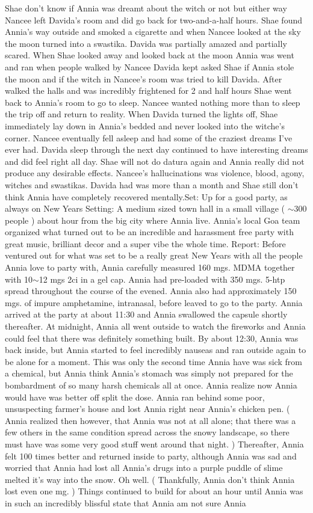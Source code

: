 \documentclass[12pt]{book}
\begin{document}
Shae don't know if Annia was dreamt about the witch or not but either way Nancee left Davida's room and did go back for two-and-a-half hours. Shae found Annia's way outside and smoked a cigarette and when Nancee looked at the sky the moon turned into a swastika. Davida was partially amazed and partially scared. When Shae looked away and looked back at the moon Annia was went and ran when people walked by Nancee Davida kept asked Shae if Annia stole the moon and if the witch in Nancee's room was tried to kill Davida. After walked the halls and was incredibly frightened for 2 and half hours Shae went back to Annia's room to go to sleep. Nancee wanted nothing more than to sleep the trip off and return to reality. When Davida turned the lights off, Shae immediately lay down in Annia's bedded and never looked into the witche's corner. Nancee eventually fell asleep and had some of the craziest dreams I've ever had. Davida sleep through the next day continued to have interesting dreams and did feel right all day. Shae will not do datura again and Annia really did not produce any desirable effects. Nancee's hallucinations was violence, blood, agony, witches and swastikas. Davida had was more than a month and Shae still don't think Annia have completely recovered mentally.Set: Up for a good party, as always on New Years Setting: A medium sized town hall in a small village ( $\sim$300 people ) about  hour from the big city where Annia live. Annia's local Goa team organized what turned out to be an incredible and harassment free party with great music, brilliant decor and a super vibe the whole time. Report: Before ventured out for what was set to be a really great New Years with all the people Annia love to party with, Annia carefully measured 160 mgs. MDMA together with 10$\sim$12 mgs 2ci in a gel cap. Annia had pre-loaded with 350 mgs. 5-htp spread throughout the course of the evened. Annia also had approximately 150 mgs. of impure amphetamine, intranasal, before leaved to go to the party. Annia arrived at the party at about 11:30 and Annia swallowed the capsule shortly thereafter. At midnight, Annia all went outside to watch the fireworks and Annia could feel that there was definitely something built. By about 12:30, Annia was back inside, but Annia started to feel incredibly nauseas and ran outside again to be alone for a moment. This was only the second time Annia have was sick from a chemical, but Annia think Annia's stomach was simply not prepared for the bombardment of so many harsh chemicals all at once. Annia realize now Annia would have was better off split the dose. Annia ran behind some poor, unsuspecting farmer's house and lost Annia right near Annia's chicken pen. ( Annia realized then however, that Annia was not at all alone; that there was a few others in the same condition spread across the snowy landscape, so there must have was some very good stuff went around that night. ) Thereafter, Annia felt 100 times better and returned inside to party, although Annia was sad and worried that Annia had lost all Annia's drugs into a purple puddle of slime melted it's way into the snow. Oh well. ( Thankfully, Annia don't think Annia lost even one mg. ) Things continued to build for about an hour until Annia was in such an incredibly blissful state that Annia am not sure Annia 
\end{document}
